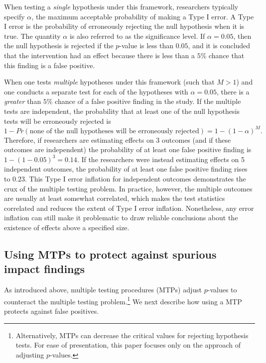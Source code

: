 \documentclass[
]{article}
\begin{document}
When testing a \emph{single} hypothesis under this framework,
researchers typically specify \(\alpha\), the maximum acceptable
probability of making a Type I error. A Type I error is the probability
of erroneously rejecting the null hypothesis when it is true. The
quantity \(\alpha\) is also referred to as the significance level. If
\(\alpha=0.05\), then the null hypothesis is rejected if the \(p\)-value
is less than \(0.05\), and it is concluded that the intervention had an
effect because there is less than a \(5\)\% chance that this finding is
a false positive.

When one tests \emph{multiple} hypotheses under this framework (such
that \(M>1\)) and one conducts a separate test for each of the
hypotheses with \(\alpha=0.05\), there is a \emph{greater} than \(5\%\)
chance of a false positive finding in the study. If the multiple tests
are independent, the probability that at least one of the null
hypothesis tests will be erroneously rejected is
\[1-Pr(\text{none of the null hypotheses will be erroneously rejected}) = 1-(1-\alpha)^M.\]
Therefore, if researchers are estimating effects on 3 outcomes (and if
these outcomes are independent) the probability of at least one false
positive finding is \(1-(1-0.05)^3=0.14\). If the researchers were
instead estimating effects on 5 independent outcomes, the probability of
at least one false positive finding rises to \(0.23\). This Type I error
inflation for independent outcomes demonstrates the crux of the multiple
testing problem. In practice, however, the multiple outcomes are usually
at least somewhat correlated, which makes the test statistics correlated
and reduces the extent of Type I error inflation. Nonetheless, any error
inflation can still make it problematic to draw reliable conclusions
about the existence of effects above a specified size.

\subsection{Using MTPs to protect against spurious impact findings}
\label{sec:mtp_use}

As introduced above, multiple testing procedures (MTPs) adjust
\(p\)-values to counteract the multiple testing
problem.\footnote{Alternatively, MTPs can decrease the critical values for rejecting hypothesis tests. For ease of presentation, this paper focuses only on the approach of adjusting $p$-values.}
We next describe how using a MTP protects against false positives.
\end{document}
